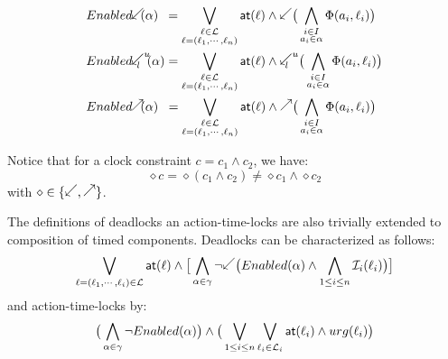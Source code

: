 \begin{align*}
  &\enabledbackward{\alpha}\hspace{1.8mm}=\bigvee_{\substack{\loc\in\Loc\\
  \loc=(\loc_1,\cdots,\loc_n)}}\al{\loc}\wedge \backward\big(\bigwedge_{\substack{
    i\in{I}\\a_i\in\alpha}}\Phi(a_i,\loc_i)\big) \\
  &\enabledbackwardb{\alpha}{l}{u}=\bigvee_{\substack{\loc\in\Loc\\
  \loc=(\loc_1,\cdots,\loc_n)}}\al{\loc}\wedge \backwardp{l}{u}\big(\bigwedge_{
    \substack{i\in{I}\\a_i\in\alpha}}\Phi(a_i,\loc_i)\big) \\
  &\enabledforward{\alpha}\hspace{1.9mm}=\bigvee_{\substack{\loc\in\Loc\\
  \loc=(\loc_1,\cdots,\loc_n)}}\al{\loc}\wedge \forward\big(\bigwedge_{\substack{
    i\in{I}\\a_i\in\alpha}}\Phi(a_i,\loc_i)\big) \\
\end{align*}

Notice that for a clock constraint $c=c_1\wedge c_2$, we have:
\begin{displaymath}
  \diamond c = \diamond (c_1\wedge c_2) \neq \diamond c_1\wedge \diamond c_2
\end{displaymath}
with $\diamond\in\{\backward,\forward\}$.

The definitions of deadlocks an action-time-locks are also trivially extended
to composition of timed components. Deadlocks can be characterized as follows:
\begin{displaymath}
  \bigvee_{\loc=(\loc_1,\cdots,\loc_i)\in\Loc}\al{\loc}\wedge
  \big[\bigwedge_{\alpha\in\gamma}\neg\backward\big(\enabled{\alpha}\wedge
  \bigwedge_{1\le i\le n}\Invb{i}{\loc_i}\big)\big]
\end{displaymath}
and action-time-locks by:
\begin{displaymath}
  \big(\bigwedge_{\alpha\in\gamma}\neg Enabled(\alpha)\big)\wedge\big(
  \bigvee_{1\le i\le n}\bigvee_{\ell_i\in\mathcal{L}_i}\textsf{at}(\ell_i)\wedge urg(\ell_i)\big)
\end{displaymath}

